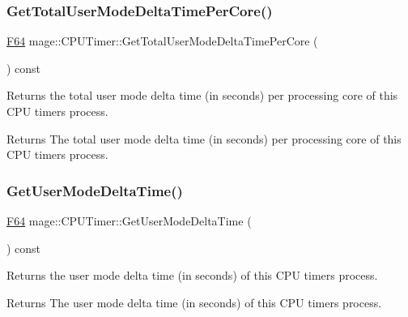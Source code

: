 \subsubsection{\texorpdfstring{Get\+Total\+User\+Mode\+Delta\+Time\+Per\+Core()}{GetTotalUserModeDeltaTimePerCore()}}
{\footnotesize\ttfamily \hyperlink{namespacemage_ad26233bbec640deda836e572c1a23708}{F64} mage\+::\+C\+P\+U\+Timer\+::\+Get\+Total\+User\+Mode\+Delta\+Time\+Per\+Core (\begin{DoxyParamCaption}{ }\end{DoxyParamCaption}) const\hspace{0.3cm}{\ttfamily [noexcept]}}

Returns the total user mode delta time (in seconds) per processing core of this C\+PU timer\textquotesingle{}s process.

\begin{DoxyReturn}{Returns}
The total user mode delta time (in seconds) per processing core of this C\+PU timer\textquotesingle{}s process. 
\end{DoxyReturn}
\hypertarget{classmage_1_1_c_p_u_timer_aa6873914da66a6be49ff69253f236f3e}{}\label{classmage_1_1_c_p_u_timer_aa6873914da66a6be49ff69253f236f3e} 
\subsubsection{\texorpdfstring{Get\+User\+Mode\+Delta\+Time()}{GetUserModeDeltaTime()}}
{\footnotesize\ttfamily \hyperlink{namespacemage_ad26233bbec640deda836e572c1a23708}{F64} mage\+::\+C\+P\+U\+Timer\+::\+Get\+User\+Mode\+Delta\+Time (\begin{DoxyParamCaption}{ }\end{DoxyParamCaption}) const\hspace{0.3cm}{\ttfamily [noexcept]}}

Returns the user mode delta time (in seconds) of this C\+PU timer\textquotesingle{}s process.

\begin{DoxyReturn}{Returns}
The user mode delta time (in seconds) of this C\+PU timer\textquotesingle{}s process. 
\end{DoxyReturn}
\hypertarget{classmage_1_1_c_p_u_timer_a8838f9a875f227c6783e107986c0adfc}{}\label{classmage_1_1_c_p_u_timer_a8838f9a875f227c6783e107986c0adfc} 
